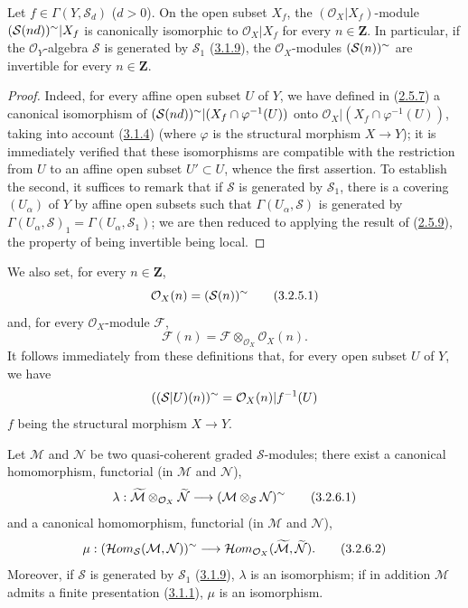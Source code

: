 \begin{proposition}[3.2.5]
\label{II.3.2.5}
Let $f\in\Gamma(Y,\mathcal{S}_d)$ ($d>0$). On the open subset $X_f$, the
$(\mathcal{O}_X|X_f)$-module
$(\mathcal{S}(nd))^{\sim}|X_f$ is canonically isomorphic to
$\mathcal{O}_X|X_f$ for every $n\in\mathbf{Z}$. In particular, if the
$\mathcal{O}_Y$-algebra $\mathcal{S}$ is generated by $\mathcal{S}_1$
\textup{(\hyperref[II.3.1.9]{3.1.9})}, the $\mathcal{O}_X$-modules
$(\mathcal{S}(n))^{\sim}$ are invertible for every $n\in\mathbf{Z}$.
\end{proposition}

\begin{proof}
Indeed, for every affine open subset $U$ of $Y$, we have defined in
(\hyperref[II.2.5.7]{2.5.7}) a canonical isomorphism of
$(\mathcal{S}(nd))^{\sim}|(X_f\cap\varphi^{-1}(U))$ onto
$\mathcal{O}_X|(X_f\cap\varphi^{-1}(U))$, taking into account
(\hyperref[II.3.1.4]{3.1.4}) (where $\varphi$ is the structural morphism
$X\to Y$); it is immediately verified that these isomorphisms are compatible
with the restriction from $U$ to an affine open subset $U'\subset U$, whence
the first assertion. To establish the second, it suffices to remark that if
$\mathcal{S}$ is generated by $\mathcal{S}_1$, there is a covering
$(U_\alpha)$ of $Y$ by affine open subsets such that
$\Gamma(U_\alpha,\mathcal{S})$ is generated by
$\Gamma(U_\alpha,\mathcal{S})_1=\Gamma(U_\alpha,\mathcal{S}_1)$; we are then
reduced to applying the result of (\hyperref[II.2.5.9]{2.5.9}), the
property of being invertible being local.
\end{proof}

We also set, for every $n\in\mathbf{Z}$,
\[
\label{II.3.2.5.1}
  \mathcal{O}_X(n)=(\mathcal{S}(n))^{\sim}
\tag{3.2.5.1}
\]
and, for every $\mathcal{O}_X$-module $\mathcal{F}$,
\[
\label{II.3.2.5.2}
  \mathcal{F}(n)=\mathcal{F}\otimes_{\mathcal{O}_X}\mathcal{O}_X(n).
\tag{3.2.5.2}
\]
It follows immediately from these definitions that, for every open subset
$U$ of $Y$, we have
\[
  ((\mathcal{S}|U)(n))^{\sim}
  =\mathcal{O}_X(n)|f^{-1}(U)
\]
$f$ being the structural morphism $X\to Y$.

\begin{proposition}[3.2.6]
\label{II.3.2.6}
Let $\mathcal{M}$ and $\mathcal{N}$ be two quasi-coherent graded
$\mathcal{S}$-modules; there exist a canonical homomorphism, functorial (in
$\mathcal{M}$ and $\mathcal{N}$),
\[
\label{II.3.2.6.1}
  \lambda:\widetilde{\mathcal{M}}
  \otimes_{\mathcal{O}_X}\widetilde{\mathcal{N}}
  \longrightarrow(\mathcal{M}\otimes_{\mathcal{S}}\mathcal{N})^{\sim}
\tag{3.2.6.1}
\]
and a canonical homomorphism, functorial (in $\mathcal{M}$ and
$\mathcal{N}$),
\[
\label{II.3.2.6.2}
  \mu:(\mathcal{H}om_{\mathcal{S}}(\mathcal{M},\mathcal{N}))^{\sim}
  \longrightarrow
  \mathcal{H}om_{\mathcal{O}_X}
  (\widetilde{\mathcal{M}},\widetilde{\mathcal{N}}).
\tag{3.2.6.2}
\]
Moreover, if $\mathcal{S}$ is generated by $\mathcal{S}_1$
\textup{(\hyperref[II.3.1.9]{3.1.9})}, $\lambda$ is an isomorphism; if in addition
$\mathcal{M}$ admits a finite presentation
\textup{(\hyperref[II.3.1.1]{3.1.1})}, $\mu$ is an isomorphism.
\end{proposition}


